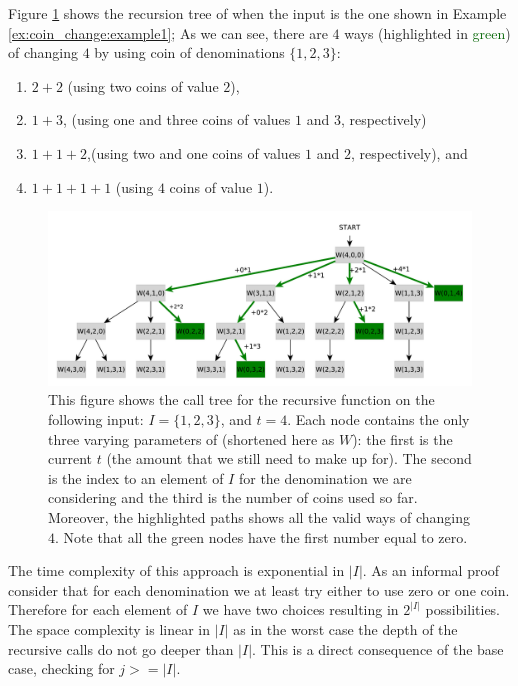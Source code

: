 Figure \ref{fig:coin_change:recursiontree} shows the recursion tree of  
when the input is the one shown in Example \ref{ex:coin_change:example1}; As we can see, there are $4$ ways (highlighted in \textcolor{darkgreen}{green}) of changing $4$ by using coin of denominations $\{1,2,3\}$:
\begin{enumerate}
	\item $2+2$ (using two coins of value $2$),
	\item $1+3$, (using one and three coins of values $1$ and $3$, respectively)
	\item $1+1+2$,(using two and one coins of values $1$ and $2$, respectively), and
	\item $1+1+1+1$ (using $4$ coins of value $1$).
\end{enumerate}
\begin{figure}
	\centering
	\includegraphics[width=\textwidth]{sources/coin_change/images/recursiontree}
	\captionsetup{singlelinecheck=off}
	\caption{This figure shows the call tree for the recursive function  on the following input:  $I = \{1,2,3\}$, and $t=4$. Each node contains the only three varying parameters of  (shortened here as $W$): the first is the current $t$ (the amount that we still need to make up for). The second   is the index to an element of $I$ for the denomination we are considering and the third is the number of coins used so far.
	Moreover, the highlighted paths shows all the valid ways of changing $4$. Note that all the green nodes have the first number equal to zero.}
	\label{fig:coin_change:recursiontree}
\end{figure}

The time complexity of this approach is exponential in $|I|$. As an informal proof consider that for each denomination we at least try either to use zero or one coin. 
Therefore for each element of $I$ we have two choices resulting in $2^{|I|}$ possibilities. 
The space complexity is linear in $|I|$ as in the worst case the depth of the recursive calls do not go deeper than $|I|$. This is a direct consequence of the base case, checking for $j >= |I|$.

